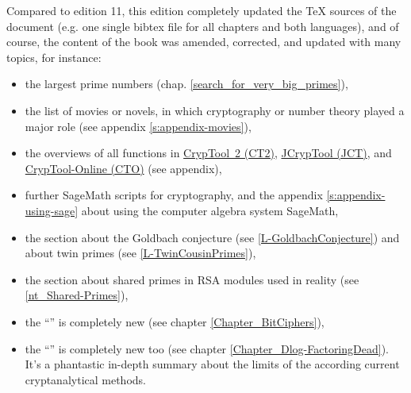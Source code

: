 Compared to edition 11, this edition completely updated the TeX sources
of the document (e.g. one single bibtex file for all chapters and both languages),
and of course, the content of the book was amended, corrected, and
updated with many topics, for instance:
\vspace{-5pt}
\begin{itemize}
  \item the largest prime numbers (chap. \ref{search_for_very_big_primes}),
  \item the list of movies or novels, in which cryptography or number theory
        played a major role (see appendix \ref{s:appendix-movies}),
  \item the overviews of all functions in
        \hyperlink{appendix-template-overview-CT2}{CrypTool~2 (CT2)},
        \hyperlink{appendix-function-overview-JCT}{JCrypTool (JCT)}, and
        \hyperlink{appendix-function-overview-CTO}{CrypTool-Online (CTO)}
        (see appendix),
  \item further SageMath scripts for cryptography, and the appendix
        \ref{s:appendix-using-sage} about using the computer algebra system
        SageMath,
  \item the section about the Goldbach conjecture
        (see \ref{L-GoldbachConjecture}) and about twin primes
        (see \ref{L-TwinCousinPrimes}),
  \item the section about shared primes in RSA modules used in reality
        (see \ref{nt_Shared-Primes}),
  \item the ``'' is completely new
        (see chapter \ref{Chapter_BitCiphers}),
  \item the ``'' is completely new too
        (see chapter \ref{Chapter_Dlog-FactoringDead}). It's a phantastic
	in-depth summary about the limits of the according current
	cryptanalytical methods.
\end{itemize}

